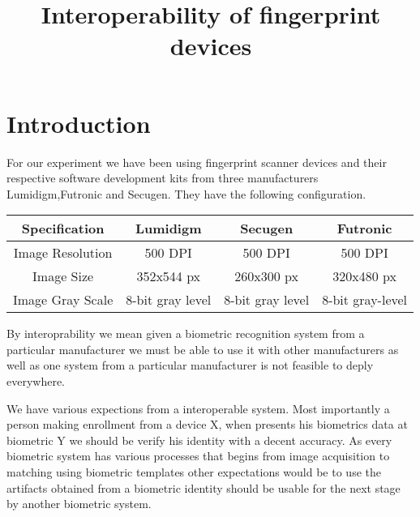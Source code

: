 \documentclass{article}
\title{Interoperability of fingerprint devices}
\begin{document}
\section*{Introduction}
For our experiment we have been using fingerprint scanner devices and their respective software development kits from three manufacturers
Lumidigm,Futronic and Secugen.
They have the following configuration.

\begin{center}
	\begin{tabular}{ | c | c | c | c | }
	\hline
	Specification & Lumidigm & Secugen & Futronic \\
	\hline
	Image Resolution & 500 DPI & 500 DPI & 500 DPI \\
	\hline
	Image Size & 352x544 px & 260x300 px & 320x480 px \\
	\hline
	Image Gray Scale & 8-bit gray level & 8-bit gray level & 8-bit gray-level \\
	\hline	
	\end{tabular}
\end{center}

By interoprability we mean given a biometric recognition system from a particular manufacturer we must be able to use it with other manufacturers as well
as one system from a particular manufacturer is not feasible to deply everywhere.


We have various expections from a interoperable system. Most importantly a person making enrollment from a device X, when  presents his biometrics data at biometric Y we should be verify his identity with a decent accuracy. As every biometric system has various processes that begins from image acquisition to matching using biometric templates other expectations would be to use the artifacts obtained from a biometric identity should be usable for the next stage by another biometric system.

\newpage
\end{document}
